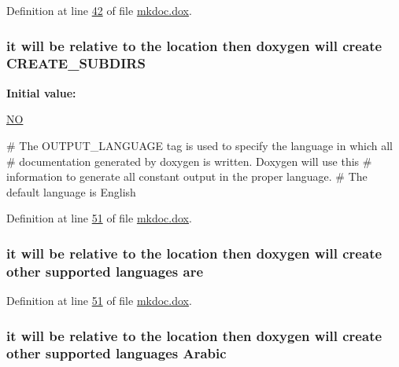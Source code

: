 Definition at line \hyperlink{mkdoc_8dox_source_l00042}{42} of file \hyperlink{mkdoc_8dox_source}{mkdoc.\-dox}.

\hypertarget{mkdoc_8dox_a77f3c876623f3cbb5ed96ca49ce6fe06}{
\subsubsection[{C\-R\-E\-A\-T\-E\-\_\-\-S\-U\-B\-D\-I\-R\-S}]{\setlength{\rightskip}{0pt plus 5cm}it will be relative to the location then doxygen will create C\-R\-E\-A\-T\-E\-\_\-\-S\-U\-B\-D\-I\-R\-S}}\label{mkdoc_8dox_a77f3c876623f3cbb5ed96ca49ce6fe06}
{\bfseries Initial value\-:}
\begin{DoxyCode}
 \hyperlink{mkdoc_8dox_a0f6a46245280dc38baf9600906aa1393}{NO}

\textcolor{preprocessor}{# The OUTPUT\_LANGUAGE tag is used to specify the language in which all }
\textcolor{preprocessor}{}\textcolor{preprocessor}{# documentation generated by doxygen is written. Doxygen will use this }
\textcolor{preprocessor}{}\textcolor{preprocessor}{# information to generate all constant output in the proper language. }
\textcolor{preprocessor}{# The default language is English}
\end{DoxyCode}


Definition at line \hyperlink{mkdoc_8dox_source_l00051}{51} of file \hyperlink{mkdoc_8dox_source}{mkdoc.\-dox}.

\hypertarget{mkdoc_8dox_a6d0965b20c4eb2235e8f9f5f0e5193ae}{
\subsubsection[{are}]{\setlength{\rightskip}{0pt plus 5cm}it will be relative to the location then doxygen will create other supported languages are}}\label{mkdoc_8dox_a6d0965b20c4eb2235e8f9f5f0e5193ae}


Definition at line \hyperlink{mkdoc_8dox_source_l00051}{51} of file \hyperlink{mkdoc_8dox_source}{mkdoc.\-dox}.

\hypertarget{mkdoc_8dox_a09569d1a0354f8f4cabb5f3633abc16b}{
\subsubsection[{Arabic}]{\setlength{\rightskip}{0pt plus 5cm}it will be relative to the location then doxygen will create other supported languages Arabic}}\label{mkdoc_8dox_a09569d1a0354f8f4cabb5f3633abc16b}


